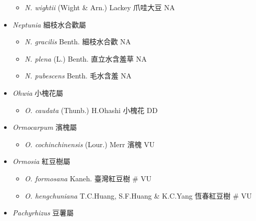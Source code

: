 \begin{itemize}
  \begin{itemize}
        \item[] \textit{N. wightii} (Wight \& Arn.) Lackey  爪哇大豆   NA
  \end{itemize}
 \item[] \textit{Neptunia} 細枝水合歡屬
                                
  \begin{itemize}
        \item[] \textit{N. gracilis} Benth.  細枝水合歡   NA
        \item[] \textit{N. plena} (L.) Benth.  直立水含羞草   NA
        \item[] \textit{N. pubescens} Benth.  毛水含羞   NA
  \end{itemize}
 \item[] \textit{Ohwia} 小槐花屬
                                
  \begin{itemize}
        \item[] \textit{O. caudata} (Thunb.) H.Ohashi  小槐花   DD
  \end{itemize}
 \item[] \textit{Ormocarpum} 濱槐屬
                                
  \begin{itemize}
        \item[] \textit{O. cochinchinensis} (Lour.) Merr  濱槐   VU
  \end{itemize}
 \item[] \textit{Ormosia} 紅豆樹屬
                                
  \begin{itemize}
        \item[] \textit{O. formosana} Kaneh.  臺灣紅豆樹  \# VU
        \item[] \textit{O. hengchuniana} T.C.Huang, S.F.Huang \& K.C.Yang  恆春紅豆樹  \# VU
  \end{itemize}
 \item[] \textit{Pachyrhizus} 豆薯屬
                                

\end{itemize}
